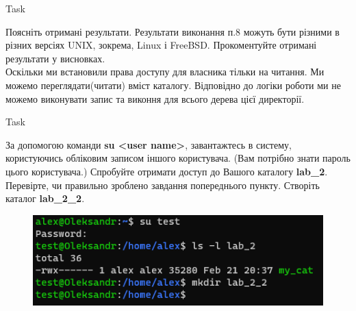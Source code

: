 \documentclass[a4paper,12pt]{article}
\newcommand{\RomanNumeralCaps}[1]{\MakeUppercase{\romannumeral #1}}
\begin{document}
    \begin{center}
        \Large{Task \RomanNumeralCaps{10}}
    \end{center}
    Поясніть отримані результати. Результати виконання п.8 можуть бути різними в різних версіях UNIX, зокрема, Linux і FreeBSD. Прокоментуйте отримані результати у
    висновках. \\
    Оскільки ми встановили права доступу для власника тільки на читання. Ми можемо переглядати(читати) вміст каталогу. 
    Відповідно до логіки роботи ми не можемо виконувати запис та виконня для всього дерева цієї директорії.
    
\newpage
    \begin{center}
        \Large{Task \RomanNumeralCaps{11}}
    \end{center}
    За допомогою команди \textbf{su <user name>}, завантажтесь в систему, користуючись обліковим записом іншого користувача. (Вам потрібно знати пароль цього
    користувача.) Спробуйте отримати доступ до Вашого каталогу \textbf{lab\_2}. Перевірте, чи правильно зроблено завдання попереднього пункту. Створіть каталог \textbf{lab\_2\_2}.
    \begin{figure}[h!]
        \begin{minipage}[h]{1\linewidth}
            \centering
            \includegraphics[width=0.6\linewidth]{Prt sc/Figure_11.png}  
        \end{minipage}
    \end{figure}
\end{document}
